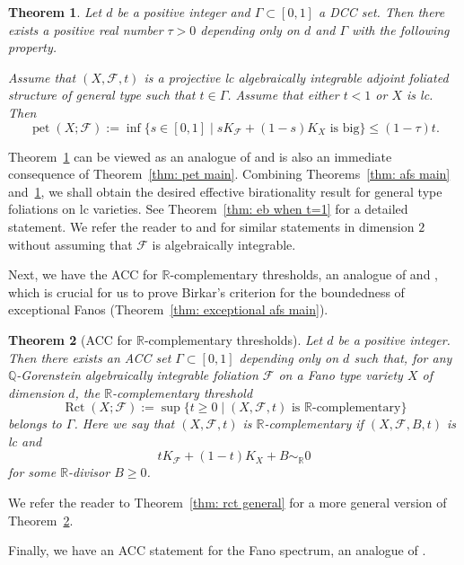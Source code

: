 \documentclass[11pt,reqno]{amsart}
\numberwithin{equation}{section}
\newcommand{\pet}{\operatorname{pet}}
\newcommand{\Rct}{\operatorname{Rct}}
\newcommand{\Ff}{\mathcal{F}}
\newcommand{\Ii}{\Gamma}
\newtheorem{thm}{Theorem}[section]
\theoremstyle{definition}
\begin{document}
\begin{thm}\label{thm: pet gap main}
Let $d$ be a positive integer and $\Ii\subset [0,1]$ a DCC set. Then there exists a positive real number $\tau>0$ depending only on $d$ and $\Ii$ with the following property. 

Assume that $(X,\Ff,t)$ is a projective lc algebraically integrable adjoint foliated structure of general type such that $t\in\Ii$. Assume that either $t<1$ or $X$ is lc. 
Then
$$\pet(X;\Ff):=\inf\{s\in [0,1]\mid sK_{\Ff}+(1-s)K_X\text{ is big}\}\leq (1-\tau)t.$$
\end{thm}
Theorem~\ref{thm: pet gap main} can be viewed as an analogue of \cite[Lemma~7.3]{HMX14} and is also an immediate consequence of Theorem~\ref{thm: pet main}. Combining Theorems~\ref{thm: afs main} and~\ref{thm: pet gap main}, we shall obtain the desired effective birationality result for general type foliations on lc varieties. See Theorem~\ref{thm: eb when t=1} for a detailed statement. We refer the reader to \cite[Theorems~1.4, 4.1]{SS23} and \cite[Theorems~1.2, 1.3]{Vas25} for similar statements in dimension $2$ without assuming that $\Ff$ is algebraically integrable. 

Next, we have the ACC for $\mathbb R$-complementary thresholds, an analogue of \cite[Theorem~5.12]{HLS24} and \cite[Theorem~21]{Sho20}, which is crucial for us to prove Birkar's criterion for the boundedness of exceptional Fanos (Theorem~\ref{thm: exceptional afs main}).

\begin{thm}[ACC for $\mathbb R$-complementary thresholds]\label{thm: r-complementary main}
    Let $d$ be a positive integer. Then there exists an ACC set $\Ii\subset [0,1]$ depending only on $d$ such that, for any $\mathbb Q$-Gorenstein algebraically integrable foliation $\Ff$ on a Fano type variety $X$ of dimension $d$, the $\mathbb R$-complementary threshold
    $$\Rct(X;\Ff):=\sup\{t\geq 0\mid (X,\Ff,t)\text{ is }\mathbb R\text{-complementary}\}$$
    belongs to $\Ii$. Here we say that $(X,\Ff,t)$ \emph{is $\mathbb R$-complementary} if $(X,\Ff,B,t)$ is lc and
    $$tK_{\Ff}+(1-t)K_X+B\sim_{\mathbb R}0$$
    for some $\mathbb R$-divisor $B\geq 0$.
\end{thm}

We refer the reader to Theorem~\ref{thm: rct general} for a more general version of Theorem~\ref{thm: r-complementary main}. 

Finally, we have an ACC statement for the Fano spectrum, an analogue of \cite[Corollary~1.10]{HMX14}. 
\end{document}
